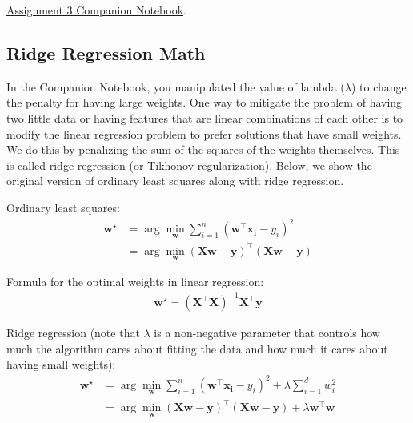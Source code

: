 \documentclass[assignment03_Solutions]{subfiles}
\begin{document}
\begin{externalresources}[(120 minutes)]

 \href{https://colab.research.google.com/drive/1p_j3y1AnX54a-Wln2J_tA50gq6iS9VEZ?usp=sharing}{Assignment 3 Companion Notebook}.
\end{externalresources}

\subsection{Ridge Regression Math}

In the Companion Notebook, you manipulated the value of lambda ($\lambda$) to change the penalty for having large weights. One way to mitigate the problem of having two little data or having features that are linear combinations of each other is to modify the linear regression problem to prefer solutions that have small weights.  We do this by penalizing the sum of the squares of the weights themselves.  This is called ridge regression (or Tikhonov regularization).  Below, we show the original version of ordinary least squares along with ridge regression.

Ordinary least squares:
\begin{align}
\mathbf{w^\star} &= \arg\min_\mathbf{w} \sum_{i=1}^n \left ( \mathbf{w}^\top \mathbf{x_i} - y_i \right)^2 \\
&= \arg\min_\mathbf{w} \left ( \mathbf{X}\mathbf{w} - \mathbf{y} \right)^\top \left ( \mathbf{X}\mathbf{w} - \mathbf{y} \right)
\end{align}

Formula for the optimal weights in linear regression:
\begin{align}
\mathbf{w^\star} = \left ( \mathbf{X}^\top \mathbf{X} \right)^{-1} \mathbf{X}^\top \mathbf{y}
\end{align}

Ridge regression (note that $\lambda$ is a non-negative parameter that controls how much the algorithm cares about fitting the data and how much it cares about having small weights):
\begin{align}
\mathbf{w^\star} &= \arg\min_\mathbf{w} \sum_{i=1}^n \left ( \mathbf{w}^\top \mathbf{x_i} - y_i \right)^2 + \lambda\sum_{i=1}^d w_i^2 \\
&= \arg\min_\mathbf{w} \left ( \mathbf{X}\mathbf{w} - \mathbf{y} \right)^\top \left ( \mathbf{X}\mathbf{w} -  \mathbf{y} \right) + \lambda \mathbf{w}^\top \mathbf{w}
\end{align}
\end{document}
